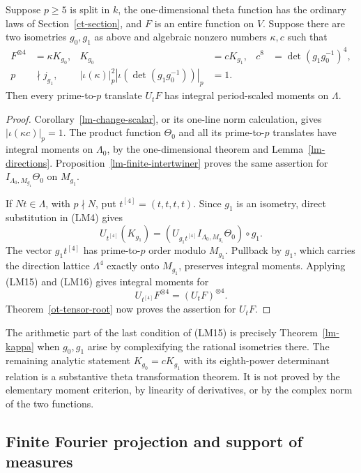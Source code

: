 \begin{theorem}\label{lm-fourth-criterion}
Suppose $p\ge5$ is split in $k$, the one-dimensional theta
function has the ordinary laws of Section~\ref{ct-section},
and $F$ is an entire function on $V$.  Suppose there are two
isometries $g_0,g_1$ as above and algebraic nonzero numbers
$\kappa,c$ such that
\[
 \begin{aligned}
 F^{\otimes4}&=\kappa K_{g_0},&
 K_{g_0}&=cK_{g_1},&
 c^8&=\det(g_1g_0^{-1})^4,\\
 p&\nmid j_{g_1},&
 |\iota(\kappa)|_p^2
      |\iota(\det(g_1g_0^{-1}))|_p&=1 .
 \end{aligned}
 \tag{LM15}
\]
Then every prime-to-$p$ translate $U_tF$ has integral
period-scaled moments on $\Lambda$.
\end{theorem}
\begin{proof}
Corollary~\ref{lm-change-scalar}, or its one-line norm
calculation, gives $|\iota(\kappa c)|_p=1$.
The product function $\Theta_0$ and all its prime-to-$p$
translates have integral moments on $\Lambda_0$, by the
one-dimensional theorem and Lemma~\ref{lm-directions}.
Proposition~\ref{lm-finite-intertwiner} proves the same assertion
for $I_{\Lambda_0,M_{g_1}}\Theta_0$ on $M_{g_1}$.

If $Nt\in\Lambda$, with $p\nmid N$, put
$t^{[4]}=(t,t,t,t)$.  Since $g_1$ is an isometry,
direct substitution in (LM4) gives
\[
 U_{t^{[4]}}(K_{g_1})
       =(U_{g_1t^{[4]}}
              I_{\Lambda_0,M_{g_1}}\Theta_0)\circ g_1.
 \tag{LM16}
\]
The vector $g_1t^{[4]}$ has prime-to-$p$ order modulo
$M_{g_1}$.  Pullback by $g_1$, which carries the direction
lattice $\Lambda^4$ exactly onto $M_{g_1}$, preserves integral
moments.  Applying (LM15) and (LM16) gives integral moments
for
\[
 U_{t^{[4]}}F^{\otimes4}=(U_tF)^{\otimes4}.
 \tag{LM17}
\]
Theorem~\ref{ot-tensor-root} now proves the assertion for $U_tF$.
\end{proof}

The arithmetic part of the last condition of (LM15) is precisely
Theorem~\ref{lm-kappa} when $g_0,g_1$ arise by complexifying the
rational isometries there.  The remaining analytic statement
$K_{g_0}=cK_{g_1}$ with its eighth-power determinant relation
is a substantive theta transformation theorem.  It is not proved
by the elementary moment criterion, by linearity of derivatives,
or by the complex norm of the two functions.

\subsection{Finite Fourier projection and support of measures}

